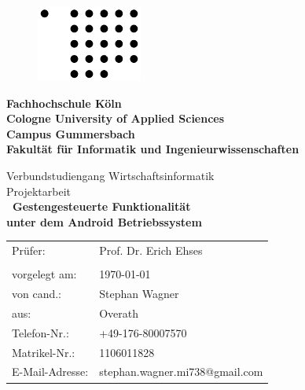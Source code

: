 \documentclass[12pt,oneside,a4paper,bibtotoc,liststotoc]{scrreprt}
\begin{document}
\begin{titlepage} 
\begin{figure}[H]
  \begin{flushright}
    \includegraphics{img/fh-koeln-logo.png}
    \label{logo_fh_köln}
  \end{flushright}
\end{figure}

\begin{center}
\textbf{\Large\newline  Fachhochschule Köln\\
Cologne University of Applied Sciences\\[0.1cm]
\normalsize Campus Gummersbach\\
Fakultät für Informatik und Ingenieurwissenschaften\\[0.5cm]}

 
\Large Verbundstudiengang Wirtschaftsinformatik\\[0.5cm]

\large Projektarbeit\\[0.1cm]
  
{ \huge \bfseries \ Gestengesteuerte Funktionalität  \\[0.1cm]
        unter dem Android Betriebssystem\\[0.5cm]
        
}
\vfill

\begin{table}[h]
\centering
\begin{tabular}{ll}
  Prüfer:         & Prof. Dr. Erich Ehses \\
                  &  \\
  vorgelegt am:   & \today \\
  von cand.:      & Stephan Wagner \\
  aus:            & Overath \\
  Telefon-Nr.:    & +49-176-80007570 \\
  Matrikel-Nr.:   & 1106011828 \\
  E-Mail-Adresse: & stephan.wagner.mi738@gmail.com
\end{tabular}
\end{table}
\end{center}
\end{titlepage}
\end{document}
